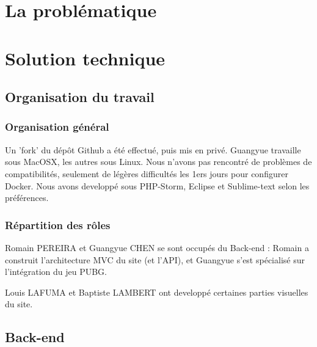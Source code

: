 \documentclass[10pt]{article}
\begin{document}
  \newpage
  \section{La problématique}
  
  \newpage
  \section{Solution technique}
    \subsection{Organisation du travail}
      \subsubsection{Organisation général}
	Un 'fork' du dépôt Github a été effectué, puis mis en privé. Guangyue travaille sous MacOSX, les autres sous Linux.
	Nous n'avons pas rencontré de problèmes de compatibilités, seulement de légères difficultés les 1ers jours pour configurer Docker.
	Nous avons developpé sous PHP-Storm, Eclipse et Sublime-text selon les préférences.
      \subsubsection{Répartition des rôles}
	Romain PEREIRA et Guangyue CHEN se sont occupés du Back-end : Romain a construit l'architecture MVC du site (et l'API),
	et Guangyue s'est spécialisé sur l'intégration du jeu PUBG.
	
	Louis LAFUMA et Baptiste LAMBERT ont developpé certaines parties visuelles du site.
    \subsection{Back-end}
\end{document}
